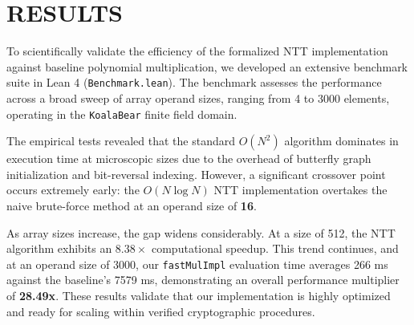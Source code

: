 \documentclass[a4paper,12pt]{report}
\begin{document}
\chapter{RESULTS}
To scientifically validate the efficiency of the formalized NTT implementation against baseline polynomial multiplication, we developed an extensive benchmark suite in Lean 4 (\texttt{Benchmark.lean}). The benchmark assesses the performance across a broad sweep of array operand sizes, ranging from 4 to 3000 elements, operating in the \texttt{KoalaBear} finite field domain. 

The empirical tests revealed that the standard $O(N^2)$ algorithm dominates in execution time at microscopic sizes due to the overhead of butterfly graph initialization and bit-reversal indexing. However, a significant crossover point occurs extremely early: the $O(N \log N)$ NTT implementation overtakes the naive brute-force method at an operand size of \textbf{16}.

As array sizes increase, the gap widens considerably. At a size of 512, the NTT algorithm exhibits an $8.38\times$ computational speedup. This trend continues, and at an operand size of 3000, our \texttt{fastMulImpl} evaluation time averages 266 ms against the baseline's 7579 ms, demonstrating an overall performance multiplier of \textbf{28.49x}. These results validate that our implementation is highly optimized and ready for scaling within verified cryptographic procedures.
\end{document}
